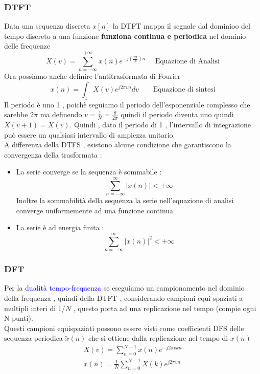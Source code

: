 \documentclass{article}
\theoremstyle{definition}
\newcommand{\suminf}{\sum_{n=-\infty}^{\infty}}
\begin{document}
	\subsubsection{DTFT}
	Data una sequenza discreta $x[n]$ la DTFT mappa il segnale dal dominioo del tempo discreto a una funzione \textbf{funziona continua e periodica} nel dominio delle frequenze 
	$$X(v)=\sum_{n=-\infty}^{+\infty}x(n)e^{-j\left(\frac{2\pi}{N}\right) n } \ \ \ \ \ \ \text{Equazione di Analisi}$$
		Ora possiamo anche definire l'antitrasformata di Fourier
	$$x(n)=\int_1 X(v)e^{j2\pi v n }dv \ \ \ \ \ \ \ \ \ \text{Equazione di sintesi}$$
	Il periodo è uno 1 , poichè seguiamo il periodo dell'esponenziale complesso che sarebbe $2\pi$ ma definendo $v=\frac{1}{N}=\frac{\theta}{2\pi }$ quindi il periodo diventa uno quindi $X(v+1)=X(v)$. Quindi , dato il periodo di 1 , l'intervallo di integrazione può essere un qualsiasi intervallo di ampiezza unitario.\\   
	A differenza della DTFS , esistono alcune condizione che garantiscono la convergenza della trasformata : 
	\begin{itemize}
		\item La serie converge se la sequenza è sommabile : 
		$$\suminf |x(n)| < +\infty $$
		Inoltre la sommabilità della sequenza la serie nell'equazione di analisi converge uniformemente ad una funzione continua 
		\item La serie è ad energia finita : 
		$$\suminf |x(n)|^2 < +\infty $$
	\end{itemize}
	\subsubsection{DFT}
	Per la \textcolor{blue}{dualità tempo-frequenza} se eseguiamo un campionamento nel dominio della frequenza , quindi della DTFT , considerando campioni equi spaziati a multipli interi di $1/N$ , questo porta ad una replicazione nel tempo (compie ogni N punti).\\ Questi campioni equispaziati possono essere visti come coefficienti DFS delle sequenza  periodica $\tilde{x}(n)$ che si ottiene dalla replicazione nel tempo di $x(n)$ 
	\begin{align*}
		X(v)=\sum_{n=0}^{N-1}x(n)e^{-j2\pi v kn} \\ 
		x(n) = \frac{1}{N} \sum_{n=0}^{N-1}X(k) e^{j2\pi v n }
	\end{align*}
	
	
	
	
	
	
	
\end{document}
